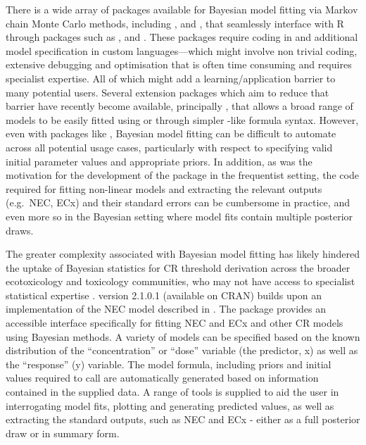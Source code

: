 \documentclass[
  shortnames]{jss}
\begin{document}
There is a wide array of packages available for Bayesian model fitting via Markov chain Monte Carlo methods, including  \citep{Lunn2000},  \citep{Plummer2003} and  \citep{Carpenter2017}, that seamlessly interface with R through packages such as ,  \citep{Su2015} and  \citep{rstan2021}. These packages require coding in  and additional model specification in custom languages---which might involve non trivial coding, extensive debugging and optimisation that is often time consuming and requires specialist expertise. All of which might add a learning/application barrier to many potential users. Several extension packages which aim to reduce that barrier have recently become available, principally  \citep{Burkner2017}, that allows a broad range of models to be easily fitted using \citep{rstan2021} or  \citep{cmdstanr2022} through simpler -like formula syntax. However, even with packages like , Bayesian model fitting can be difficult to automate across all potential usage cases, particularly with respect to specifying valid initial parameter values and appropriate priors. In addition, as was the motivation for the development of the  package in the frequentist setting, the  code required for fitting non-linear models and extracting the relevant outputs (e.g.~NEC, ECx) and their standard errors can be cumbersome in practice, and even more so in the Bayesian setting where model fits contain multiple posterior draws.

The greater complexity associated with Bayesian model fitting has likely hindered the uptake of Bayesian statistics for CR threshold derivation across the broader ecotoxicology and toxicology communities, who may not have access to specialist statistical expertise \citep{Fisher2019}.  version 2.1.0.1 (available on CRAN) builds upon an implementation of the NEC model described in \citep{Fox2010, Pires2002}. The  package provides an accessible interface specifically for fitting NEC and ECx and other CR models using Bayesian methods. A variety of models can be specified based on the known distribution of the ``concentration'' or ``dose'' variable (the predictor, x) as well as the ``response'' (y) variable. The model formula, including priors and initial values required to call  are automatically generated based on information contained in the supplied data. A range of tools is supplied to aid the user in interrogating model fits, plotting and generating predicted values, as well as extracting the standard outputs, such as NEC and ECx - either as a full posterior draw or in summary form.
\end{document}
